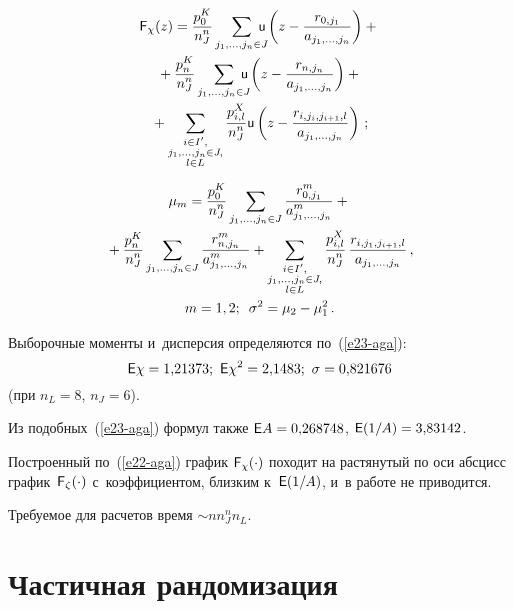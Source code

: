 \begin{multicols}{2}
\noindent 
  \begin{multline}
  {\sf F}_\chi(z)=\fr{p_0^K}{n_J^n} 
  \sum\limits_{j_1,\ldots, j_n\in J}\hspace*{-3mm} {\sf u}\left( 
z-\fr{r_{0,j_1}}{a_{j_1,\ldots, j_n}}\right) +{}\\
{}+\fr{p_n^K}{n_J^n} 
\sum\limits_{j_1,\ldots ,j_n\in J} \hspace*{-3mm}{\sf u}\left( z-\fr{r_{n,j_n}}{a_{j_1,\ldots, 
j_n}}\right)+{}\\
  {}+\sum\limits_{\substack{{i\in I^\prime,}\\
  {j_1,\ldots , j_n\in J,}\\
  {l\in L}}}
  \fr{p^X_{i,l}}{n_J^n} 
{\sf u} \left( z-\fr{r_{i,j_i,j_{i+1},l}}{a_{j_1,\ldots ,j_n}}\right)\,;\label{e22-aga}
  \end{multline}
  
  \vspace*{-12pt}
  
  \noindent
  \begin{multline}
  \mu_m=\displaystyle\frac{\displaystyle p_0^K\mathstrut}{\displaystyle n_J^n\mathstrut} \sum\limits_{j_1,\ldots ,j_n\in J} 
\displaystyle\frac{\displaystyle r^m_{0,j_1}\mathstrut}{\displaystyle a^m_{j_1,\ldots , j_n}\mathstrut}+{}\\
{}+
  \displaystyle\frac{\displaystyle p_n^K\mathstrut}{\displaystyle n_J^n\mathstrut} \sum\limits_{j_1,\ldots , j_n\in J} 
\displaystyle\frac{\displaystyle r^m_{n,j_n}\mathstrut}{\displaystyle a^m_{j_1,\ldots , j_n}\mathstrut}+  \sum\limits_{\substack{
  {i\in I^\prime,}\\
  {j_1,\ldots , j_n\in J,}\\
  {l\in L}}} \displaystyle\frac{\displaystyle p^X_{i,l}\mathstrut}{\displaystyle n_J^n\mathstrut} 
\,
 \displaystyle\frac{\displaystyle r_{i,j_1, j_{i+1},l}\mathstrut}{\displaystyle a_{j_1,\ldots , j_n}\mathstrut}\,,\\
   m=1, 2;\enskip \sigma^2=\mu_2-\mu_1^2\,.
  \label{e23-aga}
  \end{multline}
  
  Выборочные моменты и~дисперсия определяются по~(\ref{e23-aga}):
  $$
  {\sf E}\chi = 1{,}21373; \ {\sf E}\chi^2 = 2{,}1483;\ \sigma = 0{,}821676
  $$
  (при $n_L = 8$, $n_J = 6$). 
  
Из подобных~(\ref{e23-aga}) формул также ${\sf E}A \hm= 0{,}268748$, ${\sf 
E}(1/A) \hm= 3{,}83142$. 

  Построенный по~(\ref{e22-aga}) график ${\sf F}_\chi(\cdot)$ походит на 
растянутый по оси абсцисс график~${\sf F}_\zeta(\cdot)$ с~коэффициентом, 
близким к~${\sf E}(1/A)$, и~в работе не приводится. 
  
  Требуемое для расчетов время $\sim  n n_J^nn_L$. 
  
  \section{Частичная рандомизация}
  

\end{multicols}
